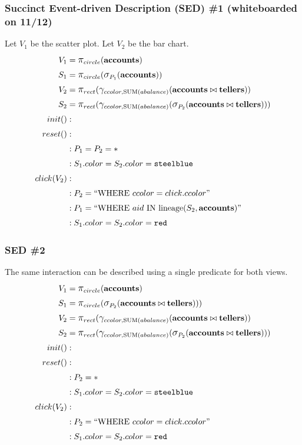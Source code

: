 \subsubsection{Succinct Event-driven Description (SED) \#1 (whiteboarded on 11/12)}
Let $V_1$ be the scatter plot.
Let $V_2$ be the bar chart.
\begin{align*}
	V_1&= \mathlarger{\pi}_{circle}(\bf{accounts})\\
	S_1&= \mathlarger{\pi}_{circle}(\mathlarger{\sigma}_{P_1}(\bf{accounts}))\\
	V_2&= \mathlarger{\pi}_{rect}(\mathlarger{\gamma}_{ccolor, \text{SUM}(abalance)}(\bf{accounts}\bowtie{}\bf{tellers}))\\
	S_2&= \mathlarger{\pi}_{rect}(\mathlarger{\gamma}_{ccolor, \text{SUM}(abalance)}(\mathlarger{\sigma}_{P_2}(\bf{accounts}\bowtie{}\bf{tellers})))\\
	init()&:\\
	reset()&:\\
	&: P_1 = P_2 = *\\
	&: S_1.color = S_2.color = \texttt{steelblue}\\
	click(V_2)&:\\
	&: P_2 = ``\text{WHERE}~ccolor=click.ccolor"\\
	&: P_1 = ``\text{WHERE}~aid~\text{IN~lineage}(S_2, \bf{accounts})"\\
	&: S_1.color = S_2.color = \texttt{red}\\
\end{align*}
\subsubsection{SED \#2}
The same interaction can be described using a single predicate for both views.
\begin{align*}
	V_1&= \mathlarger{\pi}_{circle}(\bf{accounts})\\
	S_1&= \mathlarger{\pi}_{circle}(\mathlarger{\sigma}_{P_2}(\bf{accounts}\bowtie{}\bf{tellers})))\\
	V_2&= \mathlarger{\pi}_{rect}(\mathlarger{\gamma}_{ccolor, \text{SUM}(abalance)}(\bf{accounts}\bowtie{}\bf{tellers}))\\
	S_2&= \mathlarger{\pi}_{rect}(\mathlarger{\gamma}_{ccolor, \text{SUM}(abalance)}(\mathlarger{\sigma}_{P_2}(\bf{accounts}\bowtie{}\bf{tellers})))\\
	init()&:\\
	reset()&:\\
	&: P_2 = *\\
	&: S_1.color = S_2.color = \texttt{steelblue}\\
	click(V_2)&:\\
	&: P_2 = ``\text{WHERE}~ccolor=click.ccolor"\\
	&: S_1.color = S_2.color = \texttt{red}\\
\end{align*}
